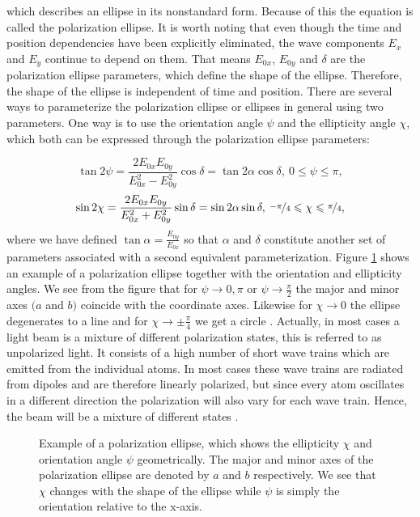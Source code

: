 which describes an ellipse in its nonstandard form. Because of this the equation is called the polarization ellipse. It is worth noting that even though the time and position dependencies have been explicitly eliminated, the wave components $E_x$ and $E_y$ continue to depend on them. That means $E_{0x}$, $E_{0y}$ and $\delta$ are the polarization ellipse parameters, which define the shape of the ellipse. Therefore, the shape of the ellipse is independent of time and position. There are several ways to parameterize the polarization ellipse or ellipses in general using two parameters. One way is to use the orientation angle $\psi$ and the ellipticity angle $\chi$, which both can be expressed through the polarization ellipse parameters: 

\begin{equation}
    \label{eq:ellipse_orientation}
    \tan 2\psi = \frac{2E_{0x}E_{0y}}{E_{0x}^2 - E_{0y}^2}\cos \delta = 
    \tan 2\alpha \cos \delta
    ,\: 0\leqslant\psi\leqslant\pi,
\end{equation}
\begin{equation}
    \label{eq:ellipse_ellipticity}
    \sin 2\chi = \frac{2E_{0x}E_{0y}}{E_{0x}^2 + E_{0y}^2}\sin \delta = 
    \sin 2\alpha \sin \delta,\: \nicefrac{-\pi}{4}\leqslant\chi\leqslant\nicefrac{\pi}{4},
\end{equation}
where we have defined $\tan \alpha = \frac{E_{0y}}{E_{0x}}$ so that $\alpha$ and $\delta$ constitute another set of parameters associated with a second equivalent parameterization. Figure \ref{fig:pol_ellipse} shows an example of a polarization ellipse together with the orientation and ellipticity angles. We see from the figure that for $\psi \rightarrow 0, \pi$ or $\psi \rightarrow \frac{\pi}{2}$ the major and minor axes $(a$ and $b)$ coincide with the coordinate axes. Likewise for $\chi \rightarrow 0$ the ellipse degenerates to a line and for $\chi \rightarrow \pm\frac{\pi}{4}$ we get a circle \cite{Collett2009}. Actually, in most cases a light beam is a mixture of different polarization states, this is referred to as unpolarized light. It consists of a high number of short wave trains which are emitted from the individual atoms. In most cases these wave trains are radiated from dipoles and are therefore linearly polarized, but since every atom oscillates in a different direction the polarization will also vary for each wave train. Hence, the beam will be a mixture of different states \cite{Roth2019}. 
\begin{figure}[h]
    \centering
    
    \caption{Example of a polarization ellipse, which shows the ellipticity $\chi$ and orientation angle $\psi$ geometrically. The major and minor axes of the polarization ellipse are denoted by $a$ and $b$ respectively. We see that $\chi$ changes with the shape of the ellipse while $\psi$ is simply the orientation relative to the x-axis.}
    \label{fig:pol_ellipse}
\end{figure}

